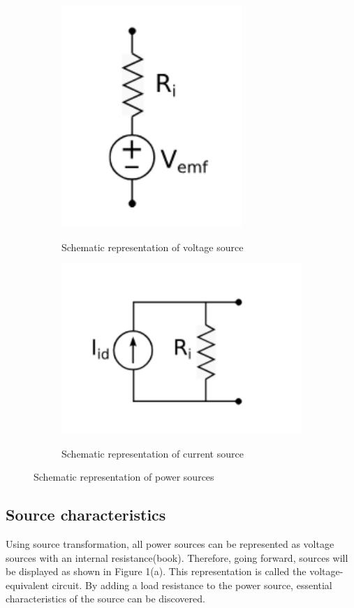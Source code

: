 \documentclass[a4paper]{article}
\begin{document}
\begin{figure}[!ht]
    \centering
    \begin{subfigure}{0.5\textwidth}
        \centering
        \includegraphics[width = 0.5 \linewidth]{Voltagesource.png}
    \label{fig:1a}
        \caption{Schematic representation of voltage source}
    \end{subfigure}%
    \begin{subfigure}{0.5\textwidth}
        \centering
        \includegraphics[width = 0.7\linewidth]{Currentsource.png}        
    \label{fig:1b}
        \caption{Schematic representation of current source}
    \end{subfigure}
\label{fig:1}
    \caption{Schematic representation of power sources}  
\end{figure}

\subsection{Source characteristics}
Using source transformation, all power sources can be represented as voltage
sources with an internal resistance(book). Therefore, going forward, sources
will be displayed as shown in Figure 1(a). This representation is called the
voltage-equivalent circuit. By adding a load resistance to the power source, essential characteristics of
the source can be discovered.
\end{document}
